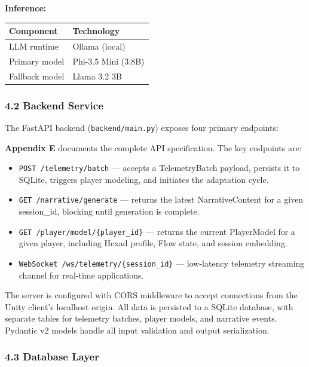 \textbf{Inference:}

\begin{longtable}[]{@{}ll@{}}
\toprule\noalign{}
Component & Technology \\
\midrule\noalign{}
\endhead
\bottomrule\noalign{}
\endlastfoot
LLM runtime & Ollama (local) \\
Primary model & Phi-3.5 Mini (3.8B) \\
Fallback model & Llama 3.2 3B \\
\end{longtable}

\subsubsection{4.2 Backend Service}\label{backend-service}

The FastAPI backend (\texttt{backend/main.py}) exposes four primary
endpoints:

\textbf{Appendix E} documents the complete API specification. The key
endpoints are:

\begin{itemize}
\tightlist
\item
  \texttt{POST\ /telemetry/batch} --- accepts a TelemetryBatch payload,
  persists it to SQLite, triggers player modeling, and initiates the
  adaptation cycle.
\item
  \texttt{GET\ /narrative/generate} --- returns the latest
  NarrativeContent for a given session\_id, blocking until generation is
  complete.
\item
  \texttt{GET\ /player/model/\{player\_id\}} --- returns the current
  PlayerModel for a given player, including Hexad profile, Flow state,
  and session embedding.
\item
  \texttt{WebSocket\ /ws/telemetry/\{session\_id\}} --- low-latency
  telemetry streaming channel for real-time applications.
\end{itemize}

The server is configured with CORS middleware to accept connections from
the Unity client's localhost origin. All data is persisted to a SQLite
database, with separate tables for telemetry batches, player models, and
narrative events. Pydantic v2 models handle all input validation and
output serialization.

\subsubsection{4.3 Database Layer}\label{database-layer}

